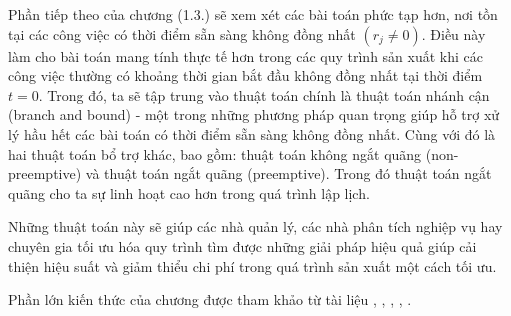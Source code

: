 Phần tiếp theo của chương (1.3.) sẽ xem xét các bài toán phức tạp hơn, nơi tồn tại các công việc có thời điểm sẵn sàng không đồng nhất $(r_j \neq 0)$. Điều này làm cho bài toán mang tính thực tế hơn trong các quy trình sản xuất khi các công việc thường có khoảng thời gian bắt đầu không đồng nhất tại thời điểm $t=0$. Trong đó, ta sẽ tập trung vào thuật toán chính là thuật toán nhánh cận (branch and bound) - một trong những phương pháp quan trọng giúp hỗ trợ xử lý hầu hết các bài toán có thời điểm sẵn sàng không đồng nhất. Cùng với đó là hai thuật toán bổ trợ khác, bao gồm: thuật toán không ngắt quãng (non-preemptive) và thuật toán ngắt quãng (preemptive). Trong đó thuật toán ngắt quãng cho ta sự linh hoạt cao hơn trong quá trình lập lịch.

Những thuật toán này sẽ giúp các nhà quản lý, các nhà phân tích nghiệp vụ hay chuyên gia tối ưu hóa quy trình tìm được những giải pháp hiệu quả giúp cải thiện hiệu suất và giảm thiểu chi phí trong quá trình sản xuất một cách tối ưu.

Phần lớn kiến thức của chương được tham khảo từ tài liệu \cite{minhhuy}, \cite{inbook}, \cite{pinedo2009planning}, \cite{PMBOK2013}, \cite{PostekZoccaAMPL2024}.























